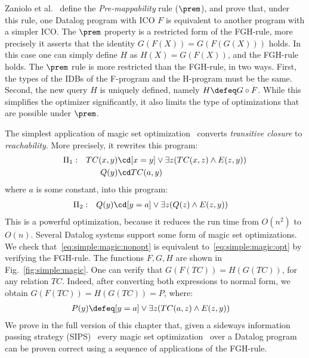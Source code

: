 \begin{ex} Zaniolo et
  al.~\cite{DBLP:journals/tplp/ZanioloYDSCI17} define the {\em
    Pre-mappability} rule ($\prem$), and prove that, under this
  rule, one Datalog program with ICO $F$ is equivalent to
  another program with a simpler ICO.
  The $\prem$ property is a
  restricted form of the FGH-rule, more precisely it asserts that the
  identity $G(F(X))=G(F(G(X)))$ holds.  In this case one can simply
  define $H$ as $H(X) = G(F(X))$, and the FGH-rule holds.  The $\prem$
  rule is more restricted than the FGH-rule, in two ways.  First, the
  types of the IDBs of the F-program and the H-program must be the
  same.  Second, the new query $H$ is uniquely
  defined, namely $H \defeq G\circ F$.  While this simplifies the
  optimizer significantly, it also limits the type of optimizations
  that are possible under $\prem$.
\end{ex}


\begin{ex}\label{ex:simple:magic} The simplest
  application of magic set
  optimization~\cite{DBLP:conf/pods/BancilhonMSU86,DBLP:conf/sigmod/MumickP94,DBLP:conf/sigmod/MumickFPR90}
  converts {\em transitive closure} to {\em reachability}.  More
  precisely, it rewrites this program:
%
  \begin{align}
\Pi_1: &&    TC(x,y) \cd & [x=y] \vee \exists z(TC(x,z) \wedge E(z,y))\nonumber\\
       &&    Q(y) \cd & TC(a,y) \label{eq:simple:magic:nonopt}
  \end{align}
%
  where $a$ is some constant, into this program:
%
  \begin{align}
\Pi_2: &&   Q(y) \cd & [y=a] \vee \exists z(Q(z) \wedge E(z,y)) \label{eq:simple:magic:opt}
  \end{align}
%
  This is a powerful optimization, because it reduces the run time from
  $O(n^2)$ to $O(n)$.  Several Datalog systems support some form of
  magic set optimizations.  We check
  that~\eqref{eq:simple:magic:nonopt} is equivalent
  to~\eqref{eq:simple:magic:opt} by verifying the FGH-rule.  The
  functions $F, G, H$ are shown in Fig.~\ref{fig:simple:magic}.  One
  can verify that $G(F(TC))=H(G(TC))$, for any relation $TC$.  Indeed,
  after converting both expressions to normal form, we obtain
  $G(F(TC))=H(G(TC)) = P$, where:
%
  \begin{align*}
    P(y) \defeq & [y=a] \vee \exists z(TC(a,z) \wedge E(z,y))
  \end{align*}
  We prove in the full version of this chapter that, given a sideways information
  passing strategy (SIPS)~\cite{DBLP:journals/jlp/BeeriR91} every magic set
  optimization~\cite{DBLP:journals/jlp/BalbinPRM91} over a Datalog program can be
  proven correct using a sequence of applications of the FGH-rule.
\end{ex}

